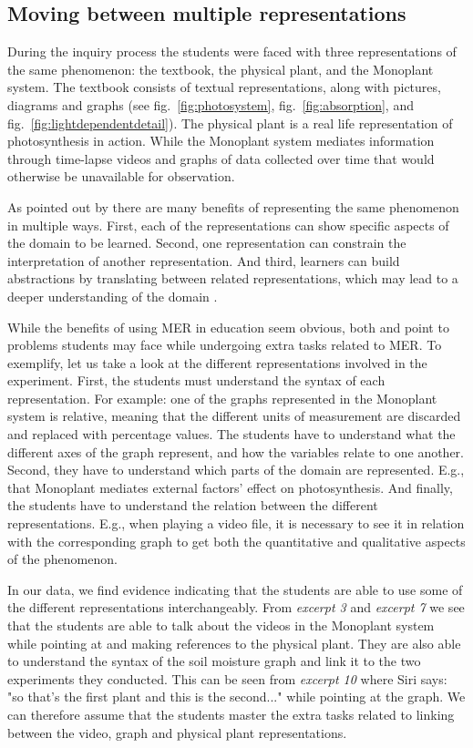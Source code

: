 \subsection{Moving between multiple representations}
During the inquiry process the students were faced with three representations of the same phenomenon: the textbook, the physical plant, and the Monoplant system. The textbook consists of textual representations, along with pictures, diagrams and graphs (see fig.~\ref{fig:photosystem}, fig.~\ref{fig:absorption}, and fig.~\ref{fig:lightdependentdetail}). The physical plant is a real life representation of photosynthesis in action. While the Monoplant system mediates information through time-lapse videos and graphs of data collected over time that would otherwise be unavailable for observation.  

As pointed out by \citet{van2006supporting} there are many benefits of representing the same phenomenon in multiple ways. First, each of the representations can show specific aspects of the domain to be learned. Second, one representation can constrain the interpretation of another representation. And third, learners can build abstractions by translating between related representations, which may lead to a deeper understanding of the domain \citep{ainsworth1999functions}. 

While the benefits of using MER in education seem obvious, both \citet{ainsworth1999functions} and \citet{van2006supporting} point to problems students may face while undergoing extra tasks related to MER. To exemplify, let us take a look at the different representations involved in the experiment. First, the students must understand the syntax of each representation. For example: one of the graphs represented in the Monoplant system is relative, meaning that the different units of measurement are discarded and replaced with percentage values. The students have to understand what the different axes of the graph represent, and how the variables relate to one another. Second, they have to understand which parts of the domain are represented. E.g., that Monoplant mediates external factors' effect on photosynthesis. And finally, the students have to understand the relation between the different representations. E.g., when playing a video file, it is necessary to see it in relation with the corresponding graph to get both the quantitative and qualitative aspects of the phenomenon.

In our data, we find evidence indicating that the students are able to use some of the different representations interchangeably. From \emph{excerpt 3} and \emph{excerpt 7} we see that the students are able to talk about the videos in the Monoplant system while pointing at and making references to the physical plant. They are also able to understand the syntax of the soil moisture graph and link it to the two experiments they conducted. This can be seen from \emph{excerpt 10} where Siri says: "so that's the first plant and this is the second..." while pointing at the graph. We can therefore assume that the students master the extra tasks related to linking between the video, graph and physical plant representations. 

